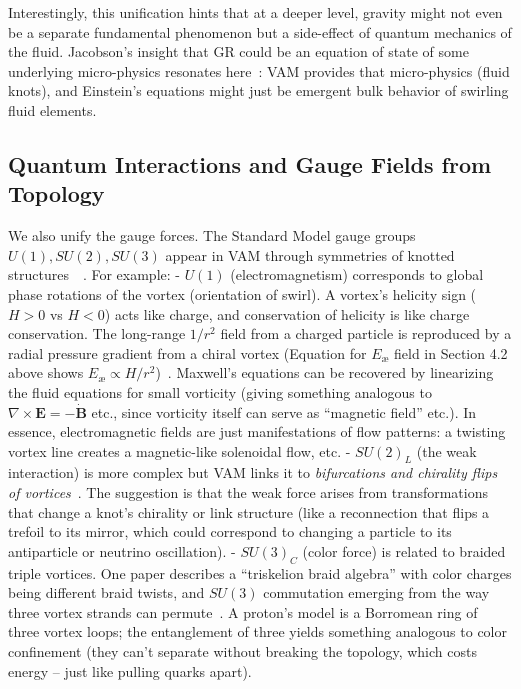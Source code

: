 \documentclass[a4paper,12pt]{article}
\begin{document}
    Interestingly, this unification hints that at a deeper level, gravity might not even be a separate fundamental phenomenon but a side-effect of quantum mechanics of the fluid. Jacobson’s insight that GR could be an equation of state of some underlying micro-physics resonates here~\cite{reference_153}: VAM provides that micro-physics (fluid knots), and Einstein’s equations might just be emergent bulk behavior of swirling fluid elements.

    \subsection{Quantum Interactions and Gauge Fields from Topology}
    We also unify the gauge forces. The Standard Model gauge groups $U(1), SU(2), SU(3)$ appear in VAM through symmetries of knotted structures~\cite{reference_154}~\cite{reference_155}. For example:
    - $U(1)$ (electromagnetism) corresponds to global phase rotations of the vortex (orientation of swirl). A vortex’s helicity sign ($H>0$ vs $H<0$) acts like charge, and conservation of helicity is like charge conservation. The long-range $1/r^2$ field from a charged particle is reproduced by a radial pressure gradient from a chiral vortex (Equation for $E_{\text{\ae}}$ field in Section 4.2 above shows $E_{\text{\ae}} \propto H/r^2$)~\cite{reference_156}. Maxwell’s equations can be recovered by linearizing the fluid equations for small vorticity (giving something analogous to $\nabla \times \mathbf{E} = -\dot{\mathbf{B}}$ etc., since vorticity itself can serve as “magnetic field” etc.). In essence, electromagnetic fields are just manifestations of flow patterns: a twisting vortex line creates a magnetic-like solenoidal flow, etc.
    - $SU(2)_L$ (the weak interaction) is more complex but VAM links it to \emph{bifurcations and chirality flips of vortices}~\cite{reference_157}. The suggestion is that the weak force arises from transformations that change a knot’s chirality or link structure (like a reconnection that flips a trefoil to its mirror, which could correspond to changing a particle to its antiparticle or neutrino oscillation).
    - $SU(3)_C$ (color force) is related to braided triple vortices. One paper describes a “triskelion braid algebra” with color charges being different braid twists, and $SU(3)$ commutation emerging from the way three vortex strands can permute~\cite{reference_158}. A proton’s model is a Borromean ring of three vortex loops; the entanglement of three yields something analogous to color confinement (they can’t separate without breaking the topology, which costs energy – just like pulling quarks apart).
\end{document}
